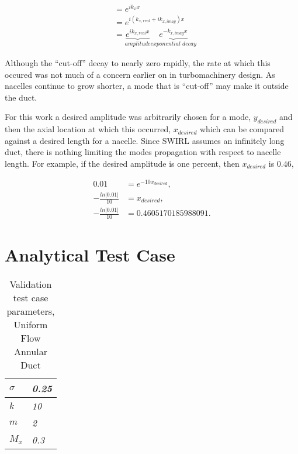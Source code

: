 \documentclass[a4paper]{report}
\begin{document}
\begin{align}
    &= e^{i k_x x} \\
    &= e^{i (k_{x,real}+ i k_{x,imag}) x} \\
    &= \underbrace{e^{i k_{x,real}x}}_{\textit{amplitude}} \underbrace{e^{- k_{x,imag} x}}_{\textit{exponential decay}} 
\end{align}

Although the ``cut-off'' decay to nearly zero rapidly, the rate at which this occured
was not much of a concern earlier on in turbomachinery design. As nacelles 
continue to grow shorter, a mode that is ``cut-off'' may make it outside the duct.

For this work a desired amplitude was arbitrarily chosen for a mode, $y_{desired}$
and then the axial location at which this occurred, $x_{desired}$ which 
can be compared against a desired length for a nacelle.  
Since SWIRL assumes an infinitely long duct, there is nothing limiting the 
modes propagation with respect to nacelle length. For example, if the 
desired amplitude is one percent, then $x_{desired}$ is $0.46$, 

\begin{align*}
    0.01 &=  e^{-10 x_{desired}},\\
    -\frac{ln|0.01|}{10} &=  x_{desired},\\
    -\frac{ln|0.01|}{10} &= 0.4605170185988091 .
\end{align*}


 
 
\section{Analytical Test Case}
\begin{table}[!h]
    \centering
    \begin{tabular}{|l|l|}
        \hline
        $\sigma$ & \textit{0.25} \\ \hline
        $k$      & \textit{10}   \\ \hline
        $m$      & \textit{2}    \\ \hline
        $M_x$    & \textit{0.3}  \\ \hline
    \end{tabular}
    \caption{Validation test case parameters, Uniform Flow Annular Duct} 
\end{table}
\end{document}
